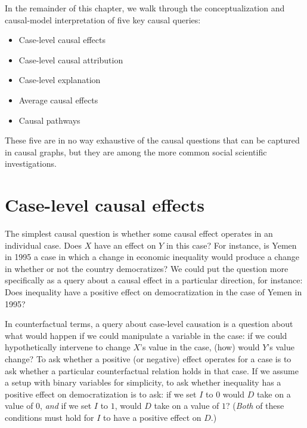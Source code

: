 \documentclass[
  12pt,
]{book}
\begin{document}
In the remainder of this chapter, we walk through the conceptualization and causal-model interpretation of five key causal queries:

\begin{itemize}
\item
  Case-level causal effects
\item
  Case-level causal attribution
\item
  Case-level explanation
\item
  Average causal effects
\item
  Causal pathways
\end{itemize}

These five are in no way exhaustive of the causal questions that can be captured in causal graphs, but they are among the more common social scientific investigations.

\hypertarget{case-level-causal-effects}{%
\section{Case-level causal effects}\label{case-level-causal-effects}}

The simplest causal question is whether some causal effect operates in an individual case. Does \(X\) have an effect on \(Y\) in this case? For instance, is Yemen in 1995 a case in which a change in economic inequality would produce a change in whether or not the country democratizes? We could put the question more specifically as a query about a causal effect in a particular direction, for instance: Does inequality have a positive effect on democratization in the case of Yemen in 1995?

In counterfactual terms, a query about case-level causation is a question about what would happen if we could manipulate a variable in the case: if we could hypothetically intervene to change \(X\)'s value in the case, (how) would \(Y\)'s value change? To ask whether a positive (or negative) effect operates for a case is to ask whether a particular counterfactual relation holds in that case. If we assume a setup with binary variables for simplicity, to ask whether inequality has a positive effect on democratization is to ask: if we set \(I\) to \(0\) would \(D\) take on a value of \(0\), \emph{and} if we set \(I\) to \(1\), would \(D\) take on a value of \(1\)? (\emph{Both} of these conditions must hold for \(I\) to have a positive effect on \(D\).)
\end{document}
